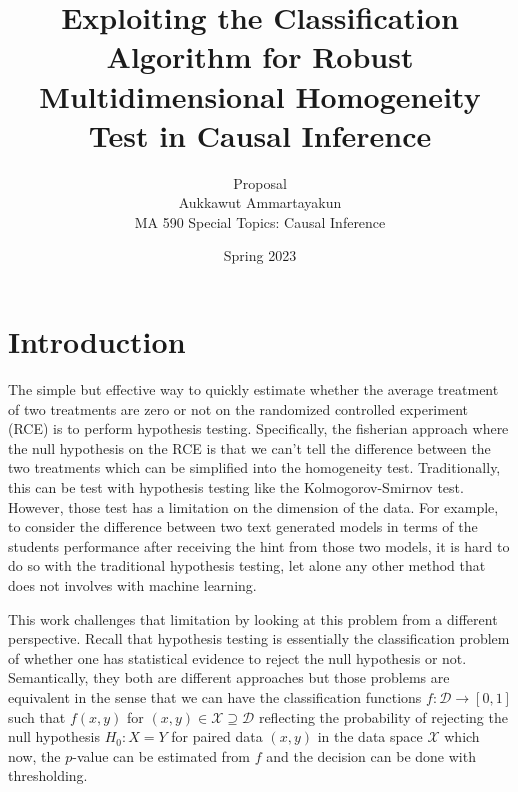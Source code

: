 \documentclass{article}
\title{
    Exploiting the Classification Algorithm for Robust Multidimensional Homogeneity Test in Causal Inference}
\author{Proposal\\Aukkawut Ammartayakun\\MA 590 Special Topics: Causal Inference}
\date{Spring 2023}
\begin{document}
\maketitle
%
%
%            
%
%


\section{Introduction}

The simple but effective way to quickly estimate whether the average treatment of two treatments are zero or not on the randomized controlled experiment (RCE) is to perform hypothesis testing. 
Specifically, the fisherian approach where the null hypothesis on the RCE is that we can't tell the difference between the two treatments which can be simplified into the homogeneity test.
Traditionally, this can be test with hypothesis testing like the Kolmogorov-Smirnov test. 
However, those test has a limitation on the dimension of the data. For example, to consider the difference between two text generated models in terms of the 
students performance after receiving the hint from those two models, it is hard to do so with the traditional hypothesis testing, let alone any other method that does not involves with machine learning.

This work challenges that limitation by looking at this problem from a different perspective. 
Recall that hypothesis testing is essentially the classification problem of whether one has statistical evidence to reject the null hypothesis or not. 
Semantically, they both are different approaches but those problems are equivalent in the sense that we can have the classification functions 
$f:\mathcal{D}\rightarrow [0,1]$ such that $f(x,y)$ for $(x,y)\in\mathcal{X} \supseteq \mathcal{D}$ reflecting the probability of rejecting the null hypothesis $H_0: X = Y$ 
for paired data $(x,y)$ in the data space $\mathcal{X}$ which now, the $p$-value can be estimated from $f$ and the decision can be done with thresholding.
\end{document}
